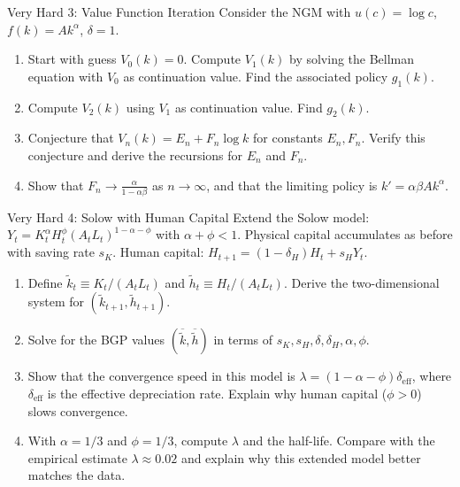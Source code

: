 \documentclass[aspectratio=169,10pt]{beamer}
\newcommand{\apxbutton}[1]{\hfill\hyperlink{#1}{\beamerbutton{Solution}}}
\begin{document}
\begin{frame}{Very Hard 3: Value Function Iteration}
\hypertarget{q-v3}{}
Consider the NGM with $u(c)=\log c$, $f(k)=Ak^\alpha$, $\delta=1$.

\begin{enumerate}
  \item Start with guess $V_0(k) = 0$. Compute $V_1(k)$ by solving the Bellman equation with $V_0$ as continuation value. Find the associated policy $g_1(k)$.
  \item Compute $V_2(k)$ using $V_1$ as continuation value. Find $g_2(k)$.
  \item Conjecture that $V_n(k) = E_n + F_n \log k$ for constants $E_n, F_n$. Verify this conjecture and derive the recursions for $E_n$ and $F_n$.
  \item Show that $F_n \to \frac{\alpha}{1-\alpha\beta}$ as $n \to \infty$, and that the limiting policy is $k' = \alpha\beta Ak^\alpha$.
\end{enumerate}
\apxbutton{s-v3}
\end{frame}

\begin{frame}{Very Hard 4: Solow with Human Capital}
\hypertarget{q-v4}{}
Extend the Solow model: $Y_t = K_t^\alpha H_t^\phi (A_tL_t)^{1-\alpha-\phi}$ with $\alpha+\phi<1$. Physical capital accumulates as before with saving rate $s_K$. Human capital: $H_{t+1} = (1-\delta_H)H_t + s_H Y_t$.

\begin{enumerate}
  \item Define $\tilde{k}_t \equiv K_t/(A_tL_t)$ and $\tilde{h}_t \equiv H_t/(A_tL_t)$. Derive the two-dimensional system for $(\tilde{k}_{t+1}, \tilde{h}_{t+1})$.
  \item Solve for the BGP values $(\overline{\tilde{k}}, \overline{\tilde{h}})$ in terms of $s_K, s_H, \delta, \delta_H, \alpha, \phi$.
  \item Show that the convergence speed in this model is $\lambda = (1-\alpha-\phi)\delta_{\text{eff}}$, where $\delta_{\text{eff}}$ is the effective depreciation rate. Explain why human capital ($\phi > 0$) slows convergence.
  \item With $\alpha=1/3$ and $\phi=1/3$, compute $\lambda$ and the half-life. Compare with the empirical estimate $\lambda \approx 0.02$ and explain why this extended model better matches the data.
\end{enumerate}
\apxbutton{s-v4}
\end{frame}
\end{document}
